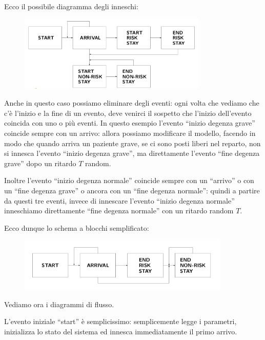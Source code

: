 \documentclass[11pt]{book}
\begin{document}
Ecco il possibile diagramma degli inneschi:

\begin{figure}[H]
  \centering
  \includegraphics[width=0.8\textwidth]{images/cap11fig15.png}
\end{figure}

Anche in questo caso possiamo eliminare degli eventi: ogni volta che
vediamo che c'\`e l'inizio e la fine di un evento, deve venirci il
sospetto che l'inizio dell'evento coincida con uno o pi\`u eventi. In
questo esempio l'evento ``inizio degenza grave'' coincide sempre con
un arrivo: allora possiamo modificare il modello, facendo in modo che
quando arriva un paziente grave, se ci sono posti liberi nel reparto,
non si innesca l'evento ``inizio degenza grave'', ma direttamente
l'evento ``fine degenza grave'' dopo un ritardo $T$ random.

Inoltre l'evento ``inizio degenza normale'' coincide sempre con un
``arrivo'' o con un ``fine degenza grave'' o ancora con un ``fine
degenza normale'': quindi a partire da questi tre eventi, invece di
innescare l'evento ``inizio degenza normale'' inneschiamo direttamente
``fine degenza normale'' con un ritardo random $T$.

Ecco dunque lo schema a blocchi semplificato:

\begin{figure}[H]
  \centering
  \includegraphics[width=0.9\textwidth]{images/cap11fig16.png}
\end{figure}

Vediamo ora i diagrammi di flusso.

L'evento iniziale ``start'' \`e semplicissimo: semplicemente legge i
parametri, inizializza lo stato del sistema ed innesca immediatamente
il primo arrivo.
\end{document}
